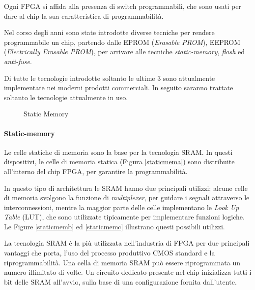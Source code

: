 Ogni FPGA si affida alla presenza di switch programmabili, che sono usati per dare al chip la sua caratteristica di programmabilità.

Nel corso degli anni sono state introdotte diverse tecniche per rendere programmabile un chip, partendo dalle EPROM (\textit{Erasable PROM}), EEPROM (\textit{Electrically Erasable PROM}), per arrivare alle tecniche  \textit{static-memory}, \textit{flash} ed \textit{anti-fuse}.

Di tutte le tecnologie introdotte soltanto le ultime $3$ sono attualmente implementate nei moderni prodotti commerciali. In seguito saranno trattate soltanto le tecnologie attualmente in uso.



\begin{figure}[H]
\centering
{}
\hspace{5mm}
\hspace{5mm}
\caption{Static Memory}\label{staticmem}
\end{figure}
\paragraph{Static-memory}
Le celle statiche di memoria sono la base per la tecnologia SRAM. In questi dispositivi, le celle di memoria statica (Figura \ref{staticmema}) sono distribuite all'interno del chip FPGA, per garantire la programmabilità.

In questo tipo di architettura le SRAM hanno due principali utilizzi; alcune celle di memoria svolgono la funzione di \textit{multiplexer}, per guidare i segnali attraverso le interconnessioni, mentre la maggior parte delle celle implementano le \textit{Look Up Table} (LUT), che sono utilizzate tipicamente per implementare funzioni logiche. Le Figure \ref{staticmemb} ed \ref{staticmemc} illustrano questi possibili utilizzi.

La tecnologia SRAM è la più utilizzata nell'industria di FPGA per due principali vantaggi che porta, l'uso del processo produttivo CMOS standard e la riprogrammabilità. Una cella di memoria SRAM può essere riprogrammata un numero illimitato di volte. Un circuito dedicato presente nel chip inizializza tutti i bit delle SRAM all'avvio, sulla base di una configurazione fornita dall'utente.

